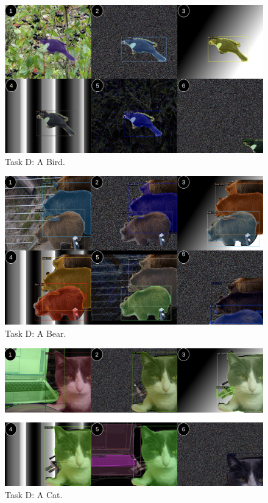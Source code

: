 \documentclass[11pt,a4paper,twocolumn,twoside]{article}
\begin{document}
\begin{figure}[hbt]
    \includegraphics[width=\textwidth,height=\textheight,keepaspectratio]{Resources/Images/task_c_bird.png}
    \caption{Task D: A Bird.}
    \label{fig:task_d_bird}
\end{figure}

\begin{figure}[hbt]
    \includegraphics[width=\textwidth,height=\textheight,keepaspectratio]{Resources/Images/task_c_bear.png}
    \caption{Task D: A Bear.}
    \label{fig:task_d_bear}
\end{figure}

\begin{figure}[hbt]
    \includegraphics[width=\textwidth,height=\textheight,keepaspectratio]{Resources/Images/task_c_cat.png}
    \caption{Task D: A Cat.}
    \label{fig:task_d_cat}
\end{figure}
\end{document}
